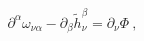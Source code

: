 \begin{equation}
\partial ^{\alpha }\omega _{\nu \alpha }-\partial _{\beta }\tilde{h}_{\nu
}^{\beta }=\partial _{\nu }\Phi \ ,  \label{hh}
\end{equation}%
